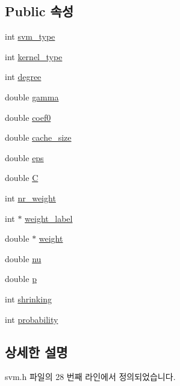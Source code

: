 \subsection*{Public 속성}
\begin{DoxyCompactItemize}
\item 
int \hyperlink{structsvm__parameter_a3afb37272180a903df05f7b649b338f4}{svm\+\_\+type}
\item 
int \hyperlink{structsvm__parameter_a4188713ba31fc3d101244a6bcc09a760}{kernel\+\_\+type}
\item 
int \hyperlink{structsvm__parameter_afef1c4508ec0045c236a3308b0fa5138}{degree}
\item 
double \hyperlink{structsvm__parameter_a91667b90506e171482b5fc619377110d}{gamma}
\item 
double \hyperlink{structsvm__parameter_a3ab3555a96a578bea6e5285a5db0a4db}{coef0}
\item 
double \hyperlink{structsvm__parameter_a00286b7e0767e45d68ac7abceb60c821}{cache\+\_\+size}
\item 
double \hyperlink{structsvm__parameter_a1feab5a4e0d5842a20e544f3f944f841}{eps}
\item 
double \hyperlink{structsvm__parameter_af4f905a3f7d589d86964289af3c9d812}{C}
\item 
int \hyperlink{structsvm__parameter_a44014738d1db5444f7f9a1ebf74e4214}{nr\+\_\+weight}
\item 
int $\ast$ \hyperlink{structsvm__parameter_a06753922bb0282240f35ae7683f8d69a}{weight\+\_\+label}
\item 
double $\ast$ \hyperlink{structsvm__parameter_afff750f99180b5ddf735404496b6c196}{weight}
\item 
double \hyperlink{structsvm__parameter_a4c20c566cb61d5808e8cabd7adbc35c1}{nu}
\item 
double \hyperlink{structsvm__parameter_a3b60d7ce96137a64caca81095d1a188b}{p}
\item 
int \hyperlink{structsvm__parameter_afdbccdf6a24be650d75804b783edc347}{shrinking}
\item 
int \hyperlink{structsvm__parameter_afac0ef02879d7e27e17ac2a75115a7d9}{probability}
\end{DoxyCompactItemize}


\subsection{상세한 설명}


svm.\+h 파일의 28 번째 라인에서 정의되었습니다.



